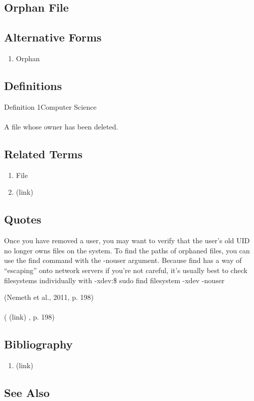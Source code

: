 \newpage \subsection*{Orphan File } \subsection*{Alternative Forms } \begin{enumerate} \item  Orphan  \end{enumerate} \subsection*{Definitions } \begin{DIC_Def}{Definition 1Computer Science }{} \paragraph{} A file whose owner has been deleted.  \end{DIC_Def} \subsection*{Related Terms } \begin{enumerate} \item  File  \item  (link) \href{Orphan (Dictionary Entry) }{ }   \end{enumerate} \subsection*{Quotes } \begin{DIC_BlockQuote} Once you have removed a user, you may want to verify that the user's old UID no longer owns files on the system. To find the paths of orphaned files, you can use the find command with the -nouser argument. Because find has a way of ``escaping'' onto network servers if you're not careful, it's usually best to check filesystems individually with -xdev:\$ sudo find filesystem -xdev -nouser  \end{DIC_BlockQuote} (Nemeth et al., 2011, p. 198)  \paragraph{} (  (link) \href{Nemeth et al., 2011 }{ } , p. 198)  \subsection*{Bibliography } \begin{enumerate} \item  (link) \href{Nemeth et al., 2011 }{ }   \end{enumerate} \subsection*{See Also } 